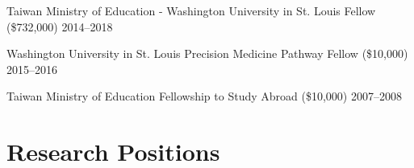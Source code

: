 \documentclass[letterpaper,11pt]{cv}
\begin{document}
\begin{entrylist}

\item Taiwan Ministry of Education - Washington University in St. Louis Fellow (\$732,000) \hfill
    2014--2018 \\
\item Washington University in St. Louis Precision Medicine Pathway Fellow (\$10,000) \hfill
    2015--2016 \\
\item Taiwan Ministry of Education Fellowship to Study Abroad (\$10,000) \hfill
    2007--2008 \\

\end{entrylist}

\section{Research Positions}
\justifying
\end{document}

